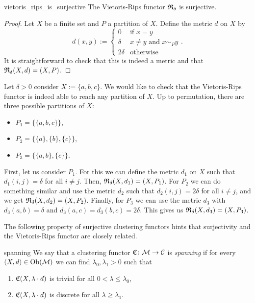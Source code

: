\begin{proposition}{\cite[Rem.~6.1]{Carlsson2010}}{vietoris_rips_is_surjective}
    The Vietoris-Rips functor $\mathfrak{R}_\delta$ is surjective.
\end{proposition}
\begin{proof}
Let $X$ be a finite set and $P$ a partition of $X$. Define the metric $d$ on $X$ by
\begin{equation*}
    d(x,y) := \begin{cases}
        0 & \text{if } x = y\\
        \delta & x \neq y \text{ and } x \sim_P y\\
        2\delta & \text{otherwise}
    \end{cases}.
\end{equation*}
It is straightforward to check that this is indeed a metric and that $\mathfrak{R}_\delta(X,d) = (X,P)$.
\end{proof}

\begin{example}{}{}
Let $\delta > 0$ consider $X := \{a,b,c\}$. We would like to check that the Vietoris-Rips functor is indeed able to reach any partition of $X$. Up to permutation, there are three possible partitions of $X$:
\begin{itemize}
    \item $P_1= \{\{a,b,c\}\}$,
    \item $P_2 = \{\{a\}, \{b\}, \{c\}\}$,
    \item $P_3 = \{\{a,b\}, \{c\}\}$.
\end{itemize}
First, let us consider $P_1$. For this we can define the metric $d_1$ on $X$ such that $d_1(i,j) = \delta$ for all $i \neq j$. Then, $\mathfrak{R}_\delta(X,d_1) = (X,P_1)$.
For $P_2$ we can do something similar and use the metric $d_2$ such that $d_2(i,j) = 2\delta$ for all $i \neq j$, and we get $\mathfrak{R}_\delta(X,d_2) = (X,P_2)$.
Finally, for $P_3$ we can use the metric $d_3$ with $d_3(a,b) = \delta$ and $d_3(a,c) = d_3(b,c) = 2\delta$. This gives us $\mathfrak{R}_\delta(X,d_3) = (X,P_3)$.
\end{example}

The following property of surjective clustering functors hints that surjectivity and the Vietoris-Rips functor are closely related.

\begin{definition}{}{spanning}
    We say that a clustering functor $\mathfrak{C}\colon \mathcal{M} \to \mathcal{C}$ is \emph{spanning} if for every ${(X,d) \in \mathrm {Ob}(\mathcal{M})}$ we can find $\lambda_0, \lambda_1 > 0$ such that
    \begin{enumerate}
        \item $\mathfrak{C}(X,\lambda \cdot d)$ is trivial for all $0 < \lambda \le \lambda_0$,
        \item $\mathfrak{C}(X,\lambda \cdot d)$ is discrete for all $\lambda \ge \lambda_1$.
    \end{enumerate}
\end{definition}

